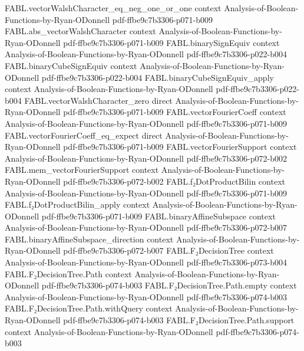 \begin{theorem}
  {FABL.vectorWalshCharacter_eq_neg_one_or_one}
  {context}
  {Analysis-of-Boolean-Functions-by-Ryan-ODonnell}
  {pdf-ffbe9c7b3306-p071-b009}
\proofstep
  {FABL.abs_vectorWalshCharacter}
  {context}
  {Analysis-of-Boolean-Functions-by-Ryan-ODonnell}
  {pdf-ffbe9c7b3306-p071-b009}
\proofstep
  {FABL.binarySignEquiv}
  {context}
  {Analysis-of-Boolean-Functions-by-Ryan-ODonnell}
  {pdf-ffbe9c7b3306-p022-b004}
\proofstep
  {FABL.binaryCubeSignEquiv}
  {context}
  {Analysis-of-Boolean-Functions-by-Ryan-ODonnell}
  {pdf-ffbe9c7b3306-p022-b004}
\proofstep
  {FABL.binaryCubeSignEquiv_apply}
  {context}
  {Analysis-of-Boolean-Functions-by-Ryan-ODonnell}
  {pdf-ffbe9c7b3306-p022-b004}
\proofstep
  {FABL.vectorWalshCharacter_zero}
  {direct}
  {Analysis-of-Boolean-Functions-by-Ryan-ODonnell}
  {pdf-ffbe9c7b3306-p071-b009}
\proofstep
  {FABL.vectorFourierCoeff}
  {context}
  {Analysis-of-Boolean-Functions-by-Ryan-ODonnell}
  {pdf-ffbe9c7b3306-p071-b009}
\proofstep
  {FABL.vectorFourierCoeff_eq_expect}
  {direct}
  {Analysis-of-Boolean-Functions-by-Ryan-ODonnell}
  {pdf-ffbe9c7b3306-p071-b009}
\proofstep
  {FABL.vectorFourierSupport}
  {context}
  {Analysis-of-Boolean-Functions-by-Ryan-ODonnell}
  {pdf-ffbe9c7b3306-p072-b002}
\proofstep
  {FABL.mem_vectorFourierSupport}
  {context}
  {Analysis-of-Boolean-Functions-by-Ryan-ODonnell}
  {pdf-ffbe9c7b3306-p072-b002}
\proofstep
  {FABL.f₂DotProductBilin}
  {context}
  {Analysis-of-Boolean-Functions-by-Ryan-ODonnell}
  {pdf-ffbe9c7b3306-p071-b009}
\proofstep
  {FABL.f₂DotProductBilin_apply}
  {context}
  {Analysis-of-Boolean-Functions-by-Ryan-ODonnell}
  {pdf-ffbe9c7b3306-p071-b009}
\proofstep
  {FABL.binaryAffineSubspace}
  {context}
  {Analysis-of-Boolean-Functions-by-Ryan-ODonnell}
  {pdf-ffbe9c7b3306-p072-b007}
\proofstep
  {FABL.binaryAffineSubspace_direction}
  {context}
  {Analysis-of-Boolean-Functions-by-Ryan-ODonnell}
  {pdf-ffbe9c7b3306-p072-b007}
\proofstep
  {FABL.F₂DecisionTree}
  {context}
  {Analysis-of-Boolean-Functions-by-Ryan-ODonnell}
  {pdf-ffbe9c7b3306-p073-b004}
\proofstep
  {FABL.F₂DecisionTree.Path}
  {context}
  {Analysis-of-Boolean-Functions-by-Ryan-ODonnell}
  {pdf-ffbe9c7b3306-p074-b003}
\proofstep
  {FABL.F₂DecisionTree.Path.empty}
  {context}
  {Analysis-of-Boolean-Functions-by-Ryan-ODonnell}
  {pdf-ffbe9c7b3306-p074-b003}
\proofstep
  {FABL.F₂DecisionTree.Path.withQuery}
  {context}
  {Analysis-of-Boolean-Functions-by-Ryan-ODonnell}
  {pdf-ffbe9c7b3306-p074-b003}
\proofstep
  {FABL.F₂DecisionTree.Path.support}
  {context}
  {Analysis-of-Boolean-Functions-by-Ryan-ODonnell}
  {pdf-ffbe9c7b3306-p074-b003}

\end{theorem}
